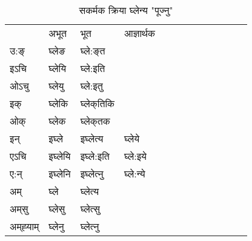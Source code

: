 \begin{table}[H]
\centering
\caption{\label{e.vt} सकर्मक क्रिया  घ्लेन्य  "पूज्नु"  }
\begin{tabular}{l|l|l|l|l|l|l|l|l|l|l|l|l}  \toprule
&अभूत & भूत & आज्ञार्थक \\ 
उ:ङ्‌ &घ्लेङ &घ्ले:ङ्‌त \\ 
इऽचि &घ्लेयि &घ्ले:इति   \\ 
ओऽचु &घ्लेयु &घ्ले:इतु   \\ 
इक् &घ्लेकि &घ्लेक्‌तिकि   \\ 
ओक् &घ्लेक &घ्लेक्‌तक   \\ 
इन् & इघ्ले & इघ्लेत्य &घ्लेये  \\ 
एऽचि & इघ्लेयि & इघ्ले:इति &घ्ले:इये    \\ 
ए:न् & इघ्लेनि  & इघ्लेत्‍नु &घ्ले:न्ये  \\ 
अम् & घ्ले & घ्लेत्य   \\ 
अम्‌सु & घ्लेसु & घ्लेत्सु     \\ 
अम्‌ह्‍याम् & घ्लेनु  & घ्लेत्‍नु \\ 
\bottomrule
\end{tabular}
\end{table}


